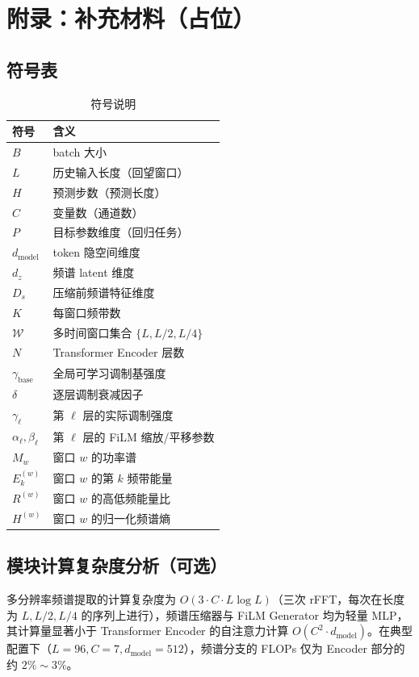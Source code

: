 \section{附录：补充材料（占位）}
\label{sec:appendix}

\subsection{符号表}
\begin{table}[h]
  \centering
  \caption{符号说明}
  \label{tab:symbols}
  \begin{tabular}{ll}
    \toprule
    符号 & 含义 \\
    \midrule
    \(B\) & batch 大小 \\
    \(L\) & 历史输入长度（回望窗口） \\
    \(H\) & 预测步数（预测长度） \\
    \(C\) & 变量数（通道数） \\
    \(P\) & 目标参数维度（回归任务） \\
    \(d_{\text{model}}\) & token 隐空间维度 \\
    \(d_z\) & 频谱 latent 维度 \\
    \(D_s\) & 压缩前频谱特征维度 \\
    \(K\) & 每窗口频带数 \\
    \(\mathcal{W}\) & 多时间窗口集合 \(\{L, L/2, L/4\}\) \\
    \(N\) & Transformer Encoder 层数 \\
    \(\gamma_{\text{base}}\) & 全局可学习调制基强度 \\
    \(\delta\) & 逐层调制衰减因子 \\
    \(\gamma_{\ell}\) & 第 \(\ell\) 层的实际调制强度 \\
    \(\alpha_{\ell}, \beta_{\ell}\) & 第 \(\ell\) 层的 FiLM 缩放/平移参数 \\
    \(M_w\) & 窗口 \(w\) 的功率谱 \\
    \(E_k^{(w)}\) & 窗口 \(w\) 的第 \(k\) 频带能量 \\
    \(R^{(w)}\) & 窗口 \(w\) 的高低频能量比 \\
    \(H^{(w)}\) & 窗口 \(w\) 的归一化频谱熵 \\
    \bottomrule
  \end{tabular}
\end{table}

\subsection{模块计算复杂度分析（可选）}
多分辨率频谱提取的计算复杂度为 \(O(3 \cdot C \cdot L \log L)\)（三次 rFFT，每次在长度为 \(L, L/2, L/4\) 的序列上进行），频谱压缩器与 FiLM Generator 均为轻量 MLP，其计算量显著小于 Transformer Encoder 的自注意力计算 \(O(C^2 \cdot d_{\text{model}})\)。在典型配置下（\(L=96, C=7, d_{\text{model}}=512\)），频谱分支的 FLOPs 仅为 Encoder 部分的约 \(2\%\sim3\%\)。

